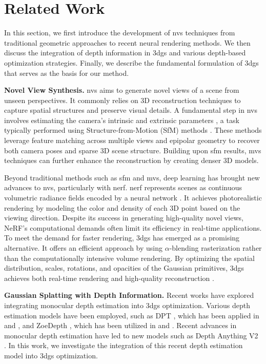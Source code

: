 \section{Related Work}
\label{Related Work}
\begin{sloppypar}
In this section, we first introduce the development of \gls{nvs} techniques from traditional geometric approaches to recent neural rendering methods. 
We then discuss the integration of depth information in \gls{3dgs} and various depth-based optimization strategies. 
Finally, we describe the fundamental formulation of \gls{3dgs} that serves as the basis for our method. 

\textbf{Novel View Synthesis.} 
\gls{nvs} aims to generate novel views of a scene from unseen perspectives. It commonly relies on 3D reconstruction techniques to capture spatial structures and preserve visual details. 
A fundamental step in \gls{nvs} involves estimating the camera’s intrinsic and extrinsic parameters \citep{mueller2019image}, a task typically performed using Structure-from-Motion (SfM) methods \citep{ullman1979interpretation}. 
These methods leverage feature matching across multiple views and epipolar geometry to recover both camera poses and sparse 3D scene structure. 
Building upon \gls{sfm} results, \gls{mvs} techniques \citep{tomasi1992shape} can further enhance the reconstruction by creating denser 3D models. 

Beyond traditional methods such as \gls{sfm} and \gls{mvs}, deep learning has brought new advances to \gls{nvs}, particularly with \gls{nerf}. 
\gls{nerf} represents scenes as continuous volumetric radiance fields encoded by a neural network \citep{mildenhall2021nerf}. It achieves photorealistic rendering by modeling the color and density of each 3D point based on the viewing direction. 
Despite its success in generating high-quality novel views, NeRF’s computational demands often limit its efficiency in real-time applications. 
To meet the demand for faster rendering, \gls{3dgs} has emerged as a promising alternative. It offers an efficient approach by using \(\alpha\)-blending rasterization rather than the computationally intensive volume rendering. 
By optimizing the spatial distribution, scales, rotations, and opacities of the Gaussian primitives, \gls{3dgs} achieves both real-time rendering and high-quality reconstruction \citep{chung2024depth}. 

\textbf{Gaussian Splatting with Depth Information.} 
Recent works have explored integrating monocular depth estimation into \gls{3dgs} optimization. 
Various depth estimation models have been employed, such as DPT \citep{ranftl2021vision}, which has been applied in \citet{chung2024depth} and \citet{turkulainen2024dn}, and ZoeDepth \citep{bhat2023zoedepth}, which has been utilized in \citet{li2024dngaussian} and \citet{zhu2023fsgs}. 
Recent advances in monocular depth estimation have led to new models such as Depth Anything V2 \citep{yang2024depth}. 
In this work, we investigate the integration of this recent depth estimation model into \gls{3dgs} optimization.


\end{sloppypar}
